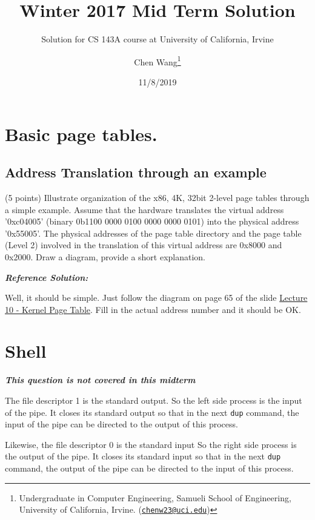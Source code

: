 \documentclass[]{article}
\title{Winter 2017 Mid Term Solution}
\subtitle{Solution for CS 143A course at University of California, Irvine}
\author{Chen Wang\footnote{Undergraduate in Computer Engineering, Samueli School
  of Engineering, University of California, Irvine.
  (\href{mailto:chenw23@uci.edu}{\nolinkurl{chenw23@uci.edu}})}}
\date{11/8/2019}
\begin{document}
\maketitle

{
\setcounter{tocdepth}{3}
\tableofcontents
}
\hypertarget{basic-page-tables.}{%
\section{Basic page tables.}\label{basic-page-tables.}}

\hypertarget{address-translation-through-an-example}{%
\subsection{Address Translation through an
example}\label{address-translation-through-an-example}}

(5 points) Illustrate organization of the x86, 4K, 32bit 2-level page
tables through a simple example. Assume that the hardware translates the
virtual address '0xc04005' (binary 0b1100 0000 0100 0000 0000 0101) into
the physical address '0x55005'. The physical addresses of the page table
directory and the page table (Level 2) involved in the translation of
this virtual address are 0x8000 and 0x2000. Draw a diagram, provide a
short explanation.

\textbf{\emph{Reference Solution:}}

Well, it should be simple. Just follow the diagram on page 65 of the
slide
\href{https://www.ics.uci.edu/~aburtsev/143A/lectures/lecture10-kernel-page-table/lecture10-kernel-page-table.pdf}{Lecture
10 - Kernel Page Table}. Fill in the actual address number and it should
be OK.

\hypertarget{shell}{%
\section{Shell}\label{shell}}

\textbf{\emph{This question is not covered in this midterm}}

The file descriptor 1 is the standard output. So the left side process
is the input of the pipe. It closes its standard output so that in the
next \texttt{dup} command, the input of the pipe can be directed to the
output of this process.

Likewise, the file descriptor 0 is the standard input So the right side
process is the output of the pipe. It closes its standard input so that
in the next \texttt{dup} command, the output of the pipe can be directed
to the input of this process.
\end{document}
